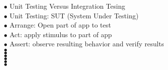 \documentclass[11pt]{article}
\begin{document}
\indent $\bullet$ Unit Testing Versus Integration Tesing \\
\indent\indent $\bullet$ Unit Testing: SUT (System Under Testing)\\
\indent\indent\indent  $\bullet$ Arrange: Open part of app to test\\ 
\indent\indent\indent  $\bullet$ Act: apply stimulus to part of app \\
\indent\indent\indent  $\bullet$ Assert: observe resulting behavior and verify results  \\
\indent\indent $\bullet$  \\
\indent\indent $\bullet$  \\
\indent\indent $\bullet$  \\
\indent\indent $\bullet$  \\
\indent\indent $\bullet$  \\
\indent\indent $\bullet$


    
\end{document}
